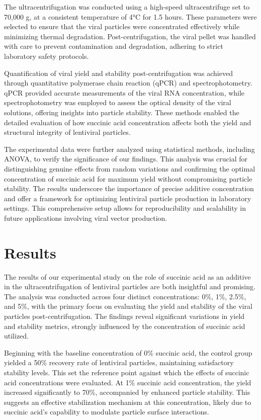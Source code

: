\documentclass{article}
\begin{document}
The ultracentrifugation was conducted using a high-speed ultracentrifuge set to 70,000 g, at a consistent temperature of 4°C for 1.5 hours. These parameters were selected to ensure that the viral particles were concentrated effectively while minimizing thermal degradation. Post-centrifugation, the viral pellet was handled with care to prevent contamination and degradation, adhering to strict laboratory safety protocols.

Quantification of viral yield and stability post-centrifugation was achieved through quantitative polymerase chain reaction (qPCR) and spectrophotometry. qPCR provided accurate measurements of the viral RNA concentration, while spectrophotometry was employed to assess the optical density of the viral solutions, offering insights into particle stability. These methods enabled the detailed evaluation of how succinic acid concentration affects both the yield and structural integrity of lentiviral particles.

The experimental data were further analyzed using statistical methods, including ANOVA, to verify the significance of our findings. This analysis was crucial for distinguishing genuine effects from random variations and confirming the optimal concentration of succinic acid for maximum yield without compromising particle stability. The results underscore the importance of precise additive concentration and offer a framework for optimizing lentiviral particle production in laboratory settings. This comprehensive setup allows for reproducibility and scalability in future applications involving viral vector production.

\section{Results}
The results of our experimental study on the role of succinic acid as an additive in the ultracentrifugation of lentiviral particles are both insightful and promising. The analysis was conducted across four distinct concentrations: 0\%, 1\%, 2.5\%, and 5\%, with the primary focus on evaluating the yield and stability of the viral particles post-centrifugation. The findings reveal significant variations in yield and stability metrics, strongly influenced by the concentration of succinic acid utilized.

Beginning with the baseline concentration of 0\% succinic acid, the control group yielded a 50\% recovery rate of lentiviral particles, maintaining satisfactory stability levels. This set the reference point against which the effects of succinic acid concentrations were evaluated. At 1\% succinic acid concentration, the yield increased significantly to 70\%, accompanied by enhanced particle stability. This suggests an effective stabilization mechanism at this concentration, likely due to succinic acid's capability to modulate particle surface interactions.
\end{document}
